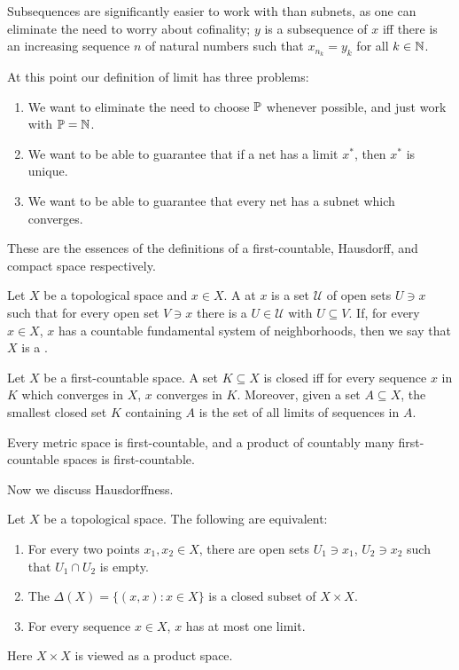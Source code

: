Subsequences are significantly easier to work with than subnets, as one can eliminate the need to worry about cofinality; $y$ is a subsequence of $x$ iff there is an increasing sequence $n$ of natural numbers such that $x_{n_k} = y_k$ for all $k \in \mathbb{N}$.

At this point our definition of limit has three problems:
\begin{enumerate}
\item We want to eliminate the need to choose $\mathbb{P}$ whenever possible, and just work with $\mathbb{P} = \mathbb{N}$.
\item We want to be able to guarantee that if a net has a limit $x^*$, then $x^*$ is unique.
\item We want to be able to guarantee that every net has a subnet which converges.
\end{enumerate}

These are the essences of the definitions of a first-countable, Hausdorff, and compact space respectively.

\begin{definition}
Let $X$ be a topological space and $x \in X$.
A  at $x$ is a set $\mathcal U$ of open sets $U \ni x$ such that for every open set $V \ni x$ there is a $U \in \mathcal U$ with $U \subseteq V$.
If, for every $x \in X$, $x$ has a countable fundamental system of neighborhoods, then we say that $X$ is a .
\end{definition}

\begin{lemma}
Let $X$ be a first-countable space.
A set $K \subseteq X$ is closed iff for every sequence $x$ in $K$ which converges in $X$, $x$ converges in $K$.
Moreover, given a set $A \subseteq X$, the smallest closed set $K$ containing $A$ is the set of all limits of sequences in $A$.
\end{lemma}

\begin{lemma}
Every metric space is first-countable, and a product of countably many first-countable spaces is first-countable.
\end{lemma}

Now we discuss Hausdorffness.

\begin{lemma}
Let $X$ be a topological space. The following are equivalent:
\begin{enumerate}
\item For every two points $x_1, x_2 \in X$, there are open sets $U_1 \ni x_1$, $U_2 \ni x_2$ such that $U_1 \cap U_2$ is empty.
\item The  $\Delta(X) = \{(x, x): x \in X\}$ is a closed subset of $X \times X$.
\item For every sequence $x \in X$, $x$ has at most one limit.
\end{enumerate}
Here $X \times X$ is viewed as a product space.
\end{lemma}

